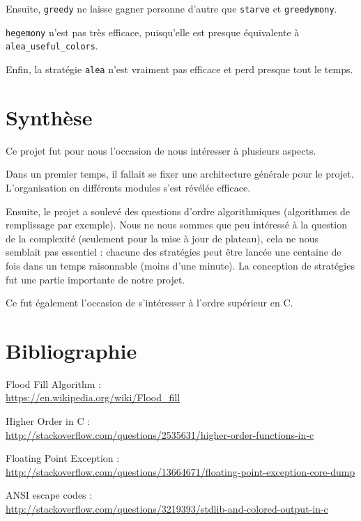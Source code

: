 \documentclass[12pt]{article}
\def\sec#1{\section{#1}}
\begin{document}
Ensuite, \texttt{greedy} ne laisse gagner personne d'autre que \texttt{starve} et \texttt{greedymony}.

\texttt{hegemony} n'est pas très efficace, puisqu'elle est presque équivalente à \texttt{alea\_useful\_colors}.

Enfin, la stratégie \texttt{alea} n'est vraiment pas efficace et perd presque tout le temps.

\sec{Synthèse}
Ce projet fut pour nous l'occasion de nous intéresser à plusieurs aspects.

Dans un premier temps, il fallait se fixer une architecture générale pour le projet. L'organisation en différents modules s'est révélée efficace.

Ensuite, le projet a soulevé des questions d'ordre algorithmiques (algorithmes de remplissage par exemple). Nous ne nous sommes que peu intéressé à la question de la complexité (seulement pour la mise à jour de plateau), cela ne nous semblait pas essentiel : chacune des stratégies peut être lancée une centaine de fois dans un temps raisonnable (moins d'une minute). La conception de stratégies fut une partie importante de notre projet.

Ce fut également l'occasion de s'intéresser à l'ordre supérieur en C.



\sec{Bibliographie}

Flood Fill Algorithm : \\ \url{https://en.wikipedia.org/wiki/Flood_fill}

Higher Order in C : \\ \url{http://stackoverflow.com/questions/2535631/higher-order-functions-in-c}

Floating Point Exception : \\ \url{http://stackoverflow.com/questions/13664671/floating-point-exception-core-dump}

ANSI escape codes : \\ \url{http://stackoverflow.com/questions/3219393/stdlib-and-colored-output-in-c}
\end{document}
